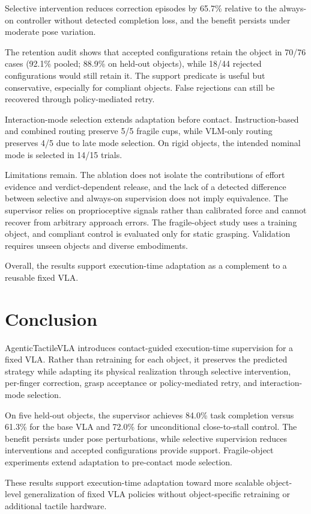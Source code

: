 \documentclass[letterpaper,10pt,conference]{ieeeconf}
\begin{document}
Selective intervention reduces correction episodes by 65.7\% relative to the
always-on controller without detected completion loss, and the benefit persists
under moderate pose variation.

The retention audit shows that accepted configurations retain the object in
70/76 cases (92.1\% pooled; 88.9\% on held-out objects), while 18/44 rejected
configurations would still retain it. The support predicate is useful but
conservative, especially for compliant objects. False rejections can still be
recovered through policy-mediated retry.

Interaction-mode selection extends adaptation before contact. Instruction-based
and combined routing preserve 5/5 fragile cups, while VLM-only routing preserves
4/5 due to late mode selection. On rigid objects, the intended nominal mode is
selected in 14/15 trials.

Limitations remain. The ablation does not isolate the contributions of effort
evidence and verdict-dependent release, and the lack of a detected difference
between selective and always-on supervision does not imply equivalence. The
supervisor relies on proprioceptive signals rather than calibrated force and
cannot recover from arbitrary approach errors. The fragile-object study uses a
training object, and compliant control is evaluated only for static grasping.
Validation requires unseen objects and diverse embodiments.

Overall, the results support execution-time adaptation as a complement to a
reusable fixed VLA.

\balance
\section{Conclusion}

AgenticTactileVLA introduces contact-guided execution-time supervision for a
fixed VLA. Rather than retraining for each object, it preserves the predicted
strategy while adapting its physical realization through selective
intervention, per-finger correction, grasp acceptance or policy-mediated retry,
and interaction-mode selection.

On five held-out objects, the supervisor achieves 84.0\% task completion versus
61.3\% for the base VLA and 72.0\% for unconditional close-to-stall control.
The benefit persists under pose perturbations, while selective supervision
reduces interventions and accepted configurations provide support.
Fragile-object experiments extend adaptation to pre-contact mode selection.

These results support execution-time adaptation toward more scalable
object-level generalization of fixed VLA policies without object-specific
retraining or additional tactile hardware.
\vspace{-1mm}



\end{document}
